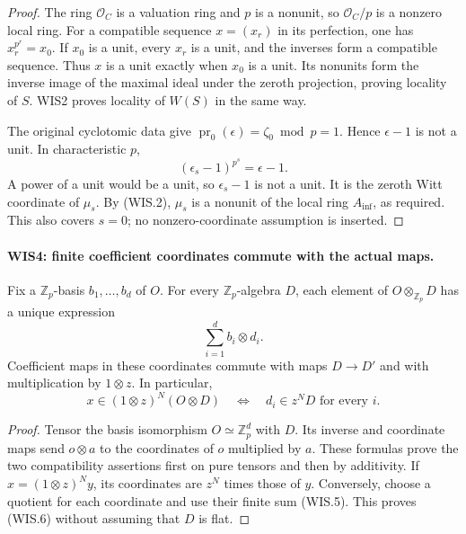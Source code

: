 \documentclass[11pt,a4paper]{article}
\numberwithin{equation}{section}
\theoremstyle{remark}\newtheorem{remark}[theorem]{Remark}
\begin{document}
\begin{proof}
The ring $\mathcal O_C$ is a valuation ring and $p$ is a nonunit,
so $\mathcal O_C/p$ is a nonzero local ring. For a compatible
sequence $x=(x_r)$ in its perfection, one has
$x_r^{p^r}=x_0$. If $x_0$ is a unit, every $x_r$ is a unit,
and the inverses form a compatible sequence. Thus $x$ is a unit
exactly when $x_0$ is a unit. Its nonunits form the inverse
image of the maximal ideal under the zeroth projection, proving
locality of $S$. WIS2 proves locality of $W(S)$ in the same way.

The original cyclotomic data give
$\operatorname{pr}_0(\epsilon)=\zeta_0\bmod p=1$.
Hence $\epsilon-1$ is not a unit.
In characteristic $p$,
\[
                     (\epsilon_s-1)^{p^s}=\epsilon-1.
\]
A power of a unit would be a unit, so $\epsilon_s-1$ is not
a unit. It is the zeroth Witt coordinate of $\mu_s$.
By (WIS.2), $\mu_s$ is a nonunit of the local ring $A_{\inf}$,
as required. This also covers $s=0$; no nonzero-coordinate
assumption is inserted.
\end{proof}

\paragraph{WIS4: finite coefficient coordinates commute with the actual maps.}
\label{claim:WIS4}
Fix a $\mathbb Z_p$-basis $b_1,\ldots,b_d$ of $O$. For every
$\mathbb Z_p$-algebra $D$, each element of $O\otimes_{\mathbb Z_p}D$
has a unique expression
\[
                          \sum_{i=1}^d b_i\otimes d_i.      \tag{WIS.5}
\]
Coefficient maps in these coordinates commute with maps $D\to D'$
and with multiplication by $1\otimes z$. In particular,
\[
 x\in(1\otimes z)^N(O\otimes D)
       \quad\Longleftrightarrow\quad d_i\in z^ND
                      \text{ for every }i.               \tag{WIS.6}
\]

\begin{proof}
Tensor the basis isomorphism $O\simeq\mathbb Z_p^d$ with $D$.
Its inverse and coordinate maps send $o\otimes a$ to the
coordinates of $o$ multiplied by $a$. These formulas prove
the two compatibility assertions first on pure tensors and
then by additivity. If $x=(1\otimes z)^Ny$, its coordinates
are $z^N$ times those of $y$. Conversely, choose a quotient
for each coordinate and use their finite sum (WIS.5).
This proves (WIS.6) without assuming that $D$ is flat.
\end{proof}

\end{document}

